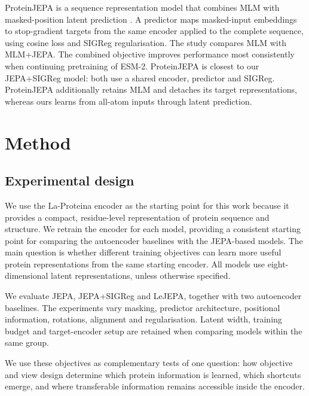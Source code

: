 \documentclass{article}
\newcommand{\aigen}[1]{\textcolor{green!50!black}{#1}}
\begin{document}
ProteinJEPA is a sequence representation model that combines MLM with masked-position latent prediction \citep{ofer2026proteinjepa}. A predictor maps masked-input embeddings to stop-gradient targets from the same encoder applied to the complete sequence, using cosine loss and SIGReg regularisation. The study compares MLM with MLM+JEPA. The combined objective improves performance most consistently when continuing pretraining of ESM-2. ProteinJEPA is closest to our JEPA+SIGReg model: both use a shared encoder, predictor and SIGReg. ProteinJEPA additionally retains MLM and detaches its target representations, whereas ours learns from all-atom inputs through latent prediction.


\section{Method}
\label{sec:method}

\subsection{Experimental design}

We use the La-Proteina encoder as the starting point for this work because it provides a compact, residue-level representation of protein sequence and structure. We retrain the encoder for each model, providing a consistent starting point for comparing the autoencoder baselines with the JEPA-based models. The main question is whether different training objectives can learn more useful protein representations from the same starting encoder. All models use eight-dimensional latent representations, unless otherwise specified.

We evaluate JEPA, JEPA+SIGReg and LeJEPA, together with two autoencoder baselines. The experiments vary masking, predictor architecture, positional information, rotations, alignment and regularisation. Latent width, training budget and target-encoder setup are retained when comparing models within the same group.

\aigen{We use these objectives as complementary tests of one question: how objective and view design determine which protein information is learned, which shortcuts emerge, and where transferable information remains accessible inside the encoder.}
\end{document}

